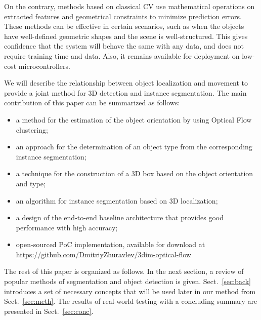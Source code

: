 \documentclass[graybox]{svmult}
\begin{document}
On the contrary, methods \cite{3d_geom,lift} based on classical CV use mathematical operations on extracted features  and geometrical constraints to minimize prediction errors. These methods can be effective in certain scenarios, such as when the objects have well-defined geometric shapes and the scene is well-structured. This gives confidence that the system will behave the same with any data, and does not require training time and data. Also, it remains available for deployment on low-cost microcontrollers.


We will describe the relationship between object localization and  movement to provide a joint method for 3D detection and instance segmentation.
The main contribution of this paper can be summarized as follows:
\begin{itemize}

    \item  a method for the estimation of the object orientation by using Optical Flow clustering;
    \item  an approach for the determination of an object type from the corresponding instance segmentation;
    \item  a technique for the construction of a 3D box  based on the object  orientation and  type;
    \item an algorithm for instance segmentation based on 3D localization;
    \item a design of the end-to-end baseline architecture that provides good performance with high accuracy;
    \item open-sourced PoC implementation, available for
download at \url{https://github.com/DmitriyZhuravlev/3dim-optical-flow}%

\end{itemize}

The rest of this paper is organized as follows. In the next section,
a review of popular methods of segmentation and object detection is given. 
Sect.~\ref{sec:back}  introduces a set of necessary concepts that will be used later in our method from Sect.~\ref{sec:meth}.
The results of real-world testing with a concluding summary are presented in Sect.~\ref{sec:conc}.
\end{document}
